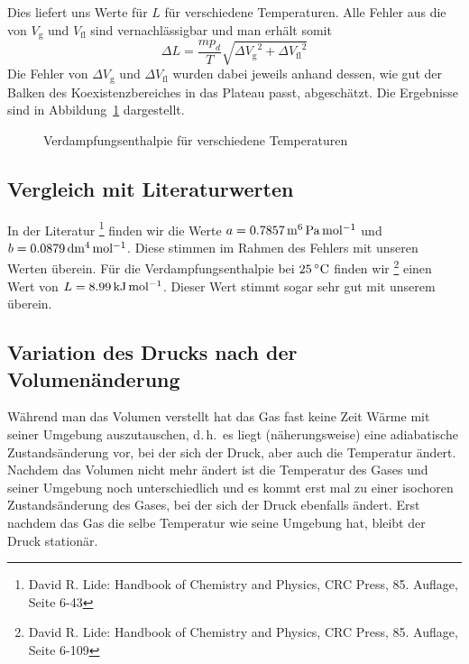 Dies liefert uns Werte für $L$ für verschiedene Temperaturen. Alle Fehler aus die von $V_\mathrm{g}$ und $V_\mathrm{fl}$ sind vernachlässigbar und man erhält somit 
\[
    \Delta L = \frac{m p_d}{T} \sqrt{{\Delta V_\mathrm{g}}^2 + {\Delta V_\mathrm{fl}}^2}
\]
Die Fehler von $\Delta V_\mathrm{g}$ und $\Delta V_\mathrm{fl}$ wurden dabei jeweils anhand dessen, wie gut der Balken des Koexistenzbereiches in das Plateau passt, abgeschätzt. Die Ergebnisse sind in Abbildung~\ref{diag:L} dargestellt.

\begin{figure}
    
    \caption{Verdampfungsenthalpie für verschiedene Temperaturen}
    \label{diag:L}
\end{figure}


\subsection{Vergleich mit Literaturwerten}

In der Literatur%
\footnote{David R. Lide: Handbook of Chemistry and Physics, CRC Press, 85. Auflage, Seite 6-43}
finden wir die Werte $a = \unit[0.7857]{m^6\, Pa\, mol^{-1}}$ und $b = \unit[0.0879]{dm^4\, mol^{-1}}$. Diese stimmen im Rahmen des Fehlers mit unseren Werten überein. Für die Verdampfungsenthalpie bei $\unit[25]{ ^\circ C}$ finden wir%
\footnote{David R. Lide: Handbook of Chemistry and Physics, CRC Press, 85. Auflage, Seite 6-109}
einen Wert von $L = \unit[8.99]{kJ\, mol^{-1}}$. Dieser Wert stimmt sogar sehr gut mit unserem überein.

\subsection{Variation des Drucks nach der Volumenänderung}

Während man das Volumen verstellt hat das Gas fast keine Zeit Wärme mit seiner Umgebung auszutauschen, d.\,h.\ es liegt (näherungsweise) eine adiabatische Zustandsänderung vor, bei der sich der Druck, aber auch die Temperatur ändert. Nachdem das Volumen nicht mehr ändert ist die Temperatur des Gases und seiner Umgebung noch unterschiedlich und es kommt erst mal zu einer isochoren Zustandsänderung des Gases, bei der sich der Druck ebenfalls ändert. Erst nachdem das Gas die selbe Temperatur wie seine Umgebung hat, bleibt der Druck stationär.

